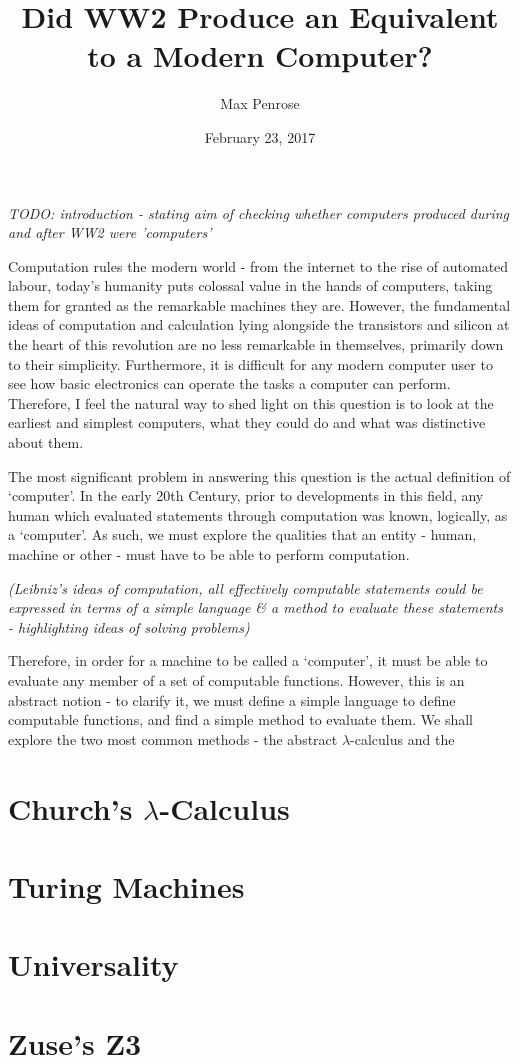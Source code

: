 \documentclass {article}
\title{Did WW2 Produce an Equivalent to a Modern Computer?}
\date{February 23, 2017}
\author{Max Penrose}
\begin{document}
\maketitle
\tableofcontents
\clearpage
\textit{TODO: introduction - stating aim of checking whether computers produced during and after WW2 were 'computers'}

Computation rules the modern world - from the internet to the rise of automated labour, today's humanity puts colossal value in the hands of computers, taking them for granted as the remarkable machines they are. However, the fundamental ideas of computation and calculation lying alongside the transistors and silicon at the heart of this revolution are no less remarkable in themselves, primarily down to their simplicity. Furthermore, it is difficult for any modern computer user to see how basic electronics can operate the tasks a computer can perform. Therefore, I feel the natural way to shed light on this question is to look at the earliest and simplest computers, what they could do and what was distinctive about them.

The most significant problem in answering this question is the actual definition of `computer'. In the early 20th Century, prior to developments in this field, any human which evaluated statements through computation was known, logically, as a `computer'. As such, we must explore the qualities that an entity - human, machine or other - must have to be able to perform computation.

\textit{(Leibniz's ideas of computation, all effectively computable statements could be expressed in terms of a simple language \& a method to evaluate these statements - highlighting ideas of solving problems)}

Therefore, in order for a machine to be called a `computer', it must be able to evaluate any member of a set of computable functions. However, this is an abstract notion - to clarify it, we must define a simple language to define computable functions, and find a simple method to evaluate them. We shall explore the two most common methods - the abstract $\lambda$-calculus and the  



\section{Church's $\lambda$-Calculus}



\section{Turing Machines}



\section{Universality}



\section{Zuse's Z3}





\end{document}
